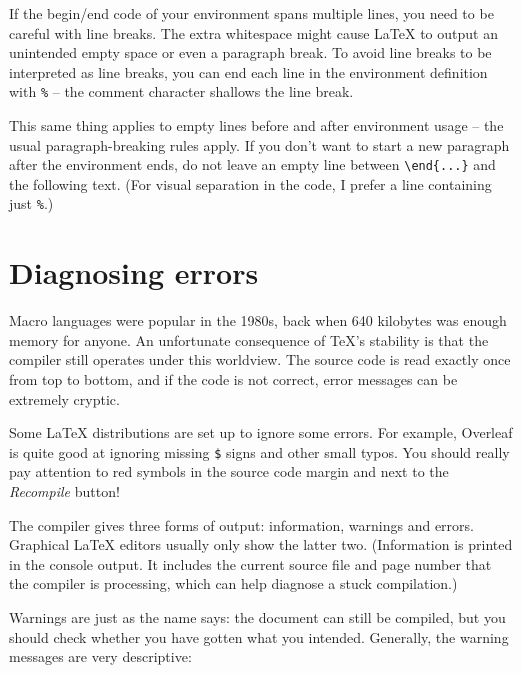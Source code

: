 \begin{gotcha}
If the begin/end code of your environment spans multiple lines,
you need to be careful with line breaks.
The extra whitespace might cause \LaTeX{} to output an unintended empty space
or even a paragraph break.
To avoid line breaks to be interpreted as line breaks,
you can end each line in the environment definition with \verb|%|
-- the comment character shallows the line break.

This same thing applies to empty lines before and after environment usage
-- the usual paragraph-breaking rules apply.
If you don't want to start a new paragraph after the environment ends,
do not leave an empty line between \verb|\end{...}| and the following text.
(For visual separation in the code, I prefer a line containing just \verb|%|.)
\end{gotcha}





%
%
%
\section{Diagnosing errors}

Macro languages were popular in the 1980s, back when 640 kilobytes was enough memory for anyone.
An unfortunate consequence of \TeX's stability is that the compiler still operates under this worldview.
The source code is read exactly once from top to bottom,
and if the code is not correct, error messages can be extremely cryptic.

\begin{overleaf}
Some \LaTeX{} distributions are set up to ignore some errors.
For example, Overleaf is quite good at ignoring missing \verb|$| signs and other small typos.
You should really pay attention to red symbols in the source code margin
and next to the \emph{Recompile} button!
\end{overleaf}

The compiler gives three forms of output: information, warnings and errors.
Graphical \LaTeX{} editors usually only show the latter two.
(Information is printed in the console output.
It includes the current source file and page number that the compiler is processing,
which can help diagnose a stuck compilation.)

Warnings are just as the name says: the document can still be compiled,
but you should check whether you have gotten what you intended.
Generally, the warning messages are very descriptive:

